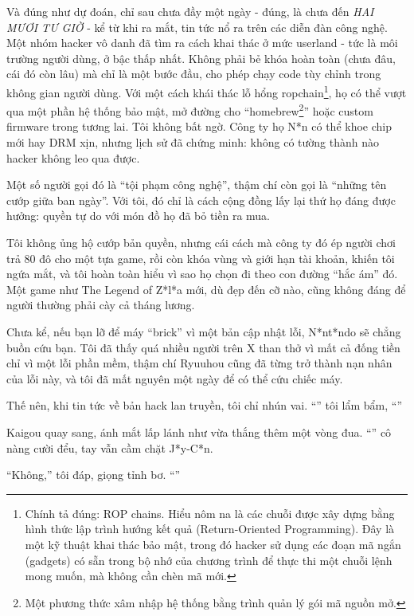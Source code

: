 \documentclass[../main.tex]{subfiles}
\begin{document}
Và đúng như dự đoán, chỉ sau chưa đầy một ngày - đúng, là chưa đến \emph{HAI MƯƠI TƯ GIỜ} - kể từ khi ra mắt, tin tức nổ ra trên các diễn đàn công nghệ. Một nhóm hacker vô danh đã tìm ra cách khai thác ở mức userland - tức là môi trường người dùng, ở bậc thấp nhất. Không phải bẻ khóa hoàn toàn (chưa đâu, cái đó còn lâu) mà chỉ là một bước đầu, cho phép chạy code tùy chỉnh trong không gian người dùng. Với một cách khái thác lỗ hổng ropchain\footnote{Chính tả đúng: ROP chains. Hiểu nôm na là các chuỗi được xây dựng bằng hình thức lập trình hướng kết quả (Return-Oriented Programming). Đây là một kỹ thuật khai thác bảo mật, trong đó hacker sử dụng các đoạn mã ngắn (gadgets) có sẵn trong bộ nhớ của chương trình để thực thi một chuỗi lệnh mong muốn, mà không cần chèn mã mới.}, họ có thể vượt qua một phần hệ thống bảo mật, mở đường cho ``homebrew\footnote{Một phương thức xâm nhập hệ thống bằng trình quản lý gói mã nguồn mở.}'' hoặc custom firmware trong tương lai. Tôi không bất ngờ. Công ty họ N*n có thể khoe chip mới hay DRM xịn, nhưng lịch sử đã chứng minh: không có tường thành nào hacker không leo qua được.

Một số người gọi đó là ``tội phạm công nghệ'', thậm chí còn gọi là ``những tên cướp giữa ban ngày''. Với tôi, đó chỉ là cách cộng đồng lấy lại thứ họ đáng được hưởng: quyền tự do với món đồ họ đã bỏ tiền ra mua.

Tôi không ủng hộ cướp bản quyền, nhưng cái cách mà công ty đó ép người chơi trả 80 đô cho một tựa game, rồi còn khóa vùng và giới hạn tài khoản, khiến tôi ngứa mắt, và tôi hoàn toàn hiểu vì sao họ chọn đi theo con đường ``hắc ám'' đó. Một game như The Legend of Z*l*a mới, dù đẹp đến cỡ nào, cũng không đáng để người thường phải cày cả tháng lương.

Chưa kể, nếu bạn lỡ để máy ``brick'' vì một bản cập nhật lỗi, N*nt*ndo sẽ chẳng buồn cứu bạn. Tôi đã thấy quá nhiều người trên X than thở vì mất cả đống tiền chỉ vì một lỗi phần mềm, thậm chí Ryuuhou cũng đã từng trở thành nạn nhân của lỗi này, và tôi đã mất nguyên một ngày để có thể cứu chiếc máy.

Thế nên, khi tin tức về bản hack lan truyền, tôi chỉ nhún vai. ``'' tôi lẩm bẩm, ``''

Kaigou quay sang, ánh mắt lấp lánh như vừa thắng thêm một vòng đua. ``'' cô nàng cười đểu, tay vẫn cầm chặt J*y-C*n.

``Không,'' tôi đáp, giọng tỉnh bơ. ``''
\end{document}
